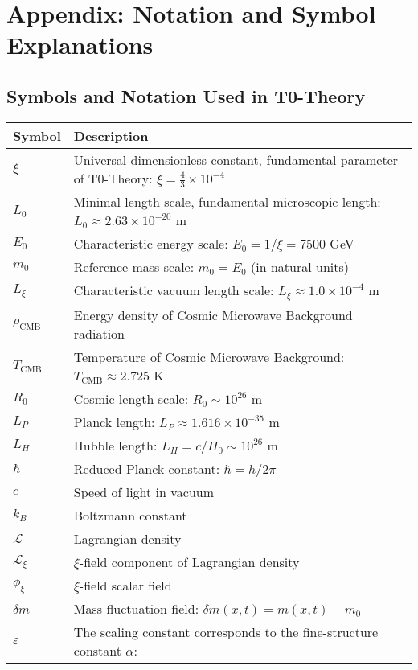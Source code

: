 \documentclass[12pt,a4paper]{article}
\numberwithin{equation}{section}
\begin{document}
\section*{Appendix: Notation and Symbol Explanations}

\subsection*{Symbols and Notation Used in T0-Theory}

\begin{longtable}{p{2cm} p{12cm}}
	\toprule
	\textbf{Symbol} & \textbf{Description} \\
	\midrule
	\endhead
	
	$\xi$ & Universal dimensionless constant, fundamental parameter of T0-Theory: $\xi = \frac{4}{3} \times 10^{-4}$ \\
	$L_0$ & Minimal length scale, fundamental microscopic length: $L_0 \approx 2.63 \times 10^{-20}$ m \\
	$E_0$ & Characteristic energy scale: $E_0 = 1/\xi = 7500$ GeV \\
	$m_0$ & Reference mass scale: $m_0 = E_0$ (in natural units) \\
	$L_\xi$ & Characteristic vacuum length scale: $L_\xi \approx 1.0 \times 10^{-4}$ m \\
	$\rho_{\text{CMB}}$ & Energy density of Cosmic Microwave Background radiation \\
	$T_{\text{CMB}}$ & Temperature of Cosmic Microwave Background: $T_{\text{CMB}} \approx 2.725$ K \\
	$R_0$ & Cosmic length scale: $R_0 \sim 10^{26}$ m \\
	$L_P$ & Planck length: $L_P \approx 1.616 \times 10^{-35}$ m \\
	$L_H$ & Hubble length: $L_H = c/H_0 \sim 10^{26}$ m \\
	$\hbar$ & Reduced Planck constant: $\hbar = h/2\pi$ \\
	$c$ & Speed of light in vacuum \\
	$k_B$ & Boltzmann constant \\
	$\mathcal{L}$ & Lagrangian density \\
	$\mathcal{L}_{\xi}$ & $\xi$-field component of Lagrangian density \\
	$\phi_\xi$ & $\xi$-field scalar field \\
	$\delta m$ & Mass fluctuation field: $\delta m(x,t) = m(x,t) - m_0$ \\
	$\varepsilon$ & The scaling constant corresponds to the fine-structure constant $\alpha$: \\

\end{longtable}
\end{document}
